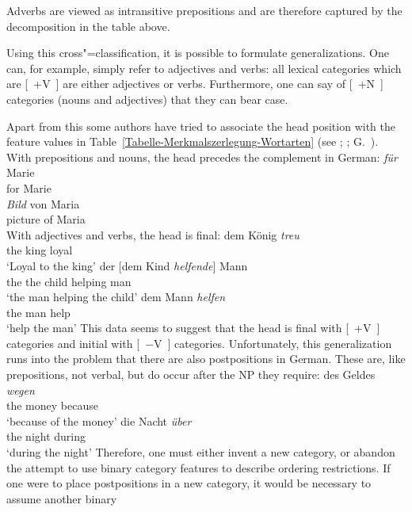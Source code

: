 \noindent
Adverbs are viewed as intransitive prepositions\label{Seite-Adverbien-PP} and are therefore captured by the decomposition in the
table above.

Using this cross"=classification, it is possible to formulate generalizations. One can, for example, simply refer to adjectives and
verbs: all lexical categories which are [~+V~] are either adjectives or verbs. Furthermore, one can
say of [~+N~] categories (nouns and adjectives) that they can bear case. 

Apart from this some authors have tried to associate the head position with the feature values in Table~\ref{Tabelle-Merkmalszerlegung-Wortarten} (see \eg \citealp[]{Grewendorf88a};
\citealp[]{Haftka96a}; G.\ \citealp[]{GMueller2011a}). With prepositions and nouns,
the head precedes the complement in German:
\eal
\ex
\gll \emph{für} Marie\\
	 for Marie\\
\ex 
\gll \emph{Bild} von Maria\\
	 picture of Maria\\
\zl
With adjectives and verbs, the head is final:
\eal
\ex 
\gll dem König \emph{treu}\\
     the king loyal\\
\glt `Loyal to the king'
\ex 
\gll der [dem Kind \emph{helfende}] Mann\\
     the the child helping man\\
\glt `the man helping the child'
\ex 
\gll dem Mann \emph{helfen}\\
     the man help\\
\glt `help the man'
\zl
This data seems to suggest that the head is final with [~+V~] categories and initial with [~$-$V~] categories. Unfortunately, this
generalization runs into the problem that there are also postpositions in German. These are, like
prepositions, not verbal, but do occur after the NP they require: 
\eal
\ex 
\gll des Geldes \emph{wegen}\\
     the money because\\
\glt `because of the money'
\ex 
\gll die Nacht \emph{über}\\
     the night during\\
\glt `during the night'
\zl
Therefore, one must either invent a new category, or abandon the attempt to use binary category features to describe ordering restrictions.
If one were to place postpositions in a new category, it would be necessary to assume another binary
